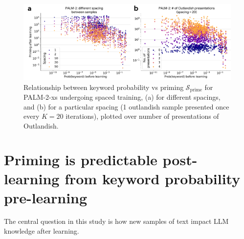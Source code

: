 \documentclass[11pt, a4paper, logo, copyright]{googledeepmind}
\theoremstyle{plain}
\theoremstyle{definition}
\theoremstyle{remark}
\begin{document}
\begin{figure}[h]
\vspace{0mm}
    \centering \includegraphics[scale=.32,clip]{figures/spacing.pdf}
    \vspace{-1mm}
    \caption{Relationship between keyword probability vs priming $\mathcal{S}_\text{prime}$ for PALM-2-xs undergoing spaced training, (a) for different spacings, and (b) for a particular spacing (1 outlandish sample presented once every $K=20$ iterations), plotted over number of presentations of Outlandish.} \label{fig:spacing}
  \vspace{-0mm}
\end{figure}

\section{Priming is predictable post-learning from keyword probability pre-learning}
\label{sec:surprise}
 
 
 The central question in this study is how new samples of text impact LLM knowledge after learning. 
 
\end{document}
